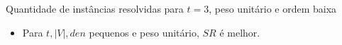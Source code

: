 \documentclass[dvipsnames]{beamer}
\begin{document}

\begin{frame}{Quantidade de instâncias resolvidas para $t = 3$, peso unitário e ordem baixa}
\begin{figure}%
    \centering
    \caption{}
    \label{fig:tree_sf3_s20_30_unit}%
\end{figure}
\begin{itemize}
  \item Para $t, |V|, den$ pequenos e peso unitário, $SR$ é melhor.
  \end{itemize}
\end{frame}
\end{document}
